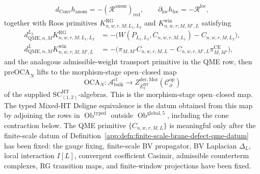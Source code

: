 \documentclass[11pt]{memoir}
\begin{document}
\begin{thm}
\[\begin{gathered}
	    d_{\mathrm{Conv}}h_{\mathrm{anom}}
	    =-(\mathcal R^{\mathrm{anom}})_{\mathrm{red}},\qquad
	    \partial_{\mathrm{loc}}h_{\mathrm{loc}}
	    =-\mathcal R^{\mathrm{loc}},
	  \end{gathered}
	  \]
		  together with Roos primitives
			  \(K^{\mathrm{RG}}_{n,w,r,M;L_1,L_2}\) and
			  \(K^{\mathrm{win}}_{n,w,r;M,M',L}\) satisfying
		  \[
		    \begin{aligned}
				    d^{L_2}_{\mathrm{QME},n,M}K^{\mathrm{RG}}_{n,w,r,M;L_1,L_2}
		    &=
			    -\bigl(W(P_{L_1,L_2},C_{n,w,r,M,L_1})
			      -C_{n,w,r,M,L_2}\bigr),\\
				    d^{L}_{\mathrm{QME},n,M}K^{\mathrm{win}}_{n,w,r;M,M',L}
		    &=
			    -\bigl(\pi_{M,M'}C_{n,w,r,M,L}
			      -C_{n,w,r,M',L}\pi^{\mathrm{CE}}_{M,M'}\bigr),
		    \end{aligned}
		  \]
		  and the analogous admissible-weight transport primitive in the QME
		  row, then \(\mathrm{preOCA}_N\) lifts to the
	  morphism-stage open--closed map
  \[
    \mathrm{OCA}_N\colon
    \mathcal A^{\mathrm{cl}}_{\mathrm{bulk}}
    \longrightarrow
    Z^{\mathrm{der},\mathrm{Mor}}_{E_2^{\mathrm{HT}}}
    (\mathcal C^{\mathrm{op}}_\partial)
  \]
  of the supplied \(\mathrm{SC}^{\mathrm{HT}}_{(1,2)}\)-algebras.  This
  is the morphism-stage open--closed map.  The typed Mixed-HT Deligne
  equivalence is the datum obtained from this map by adjoining the rows
  in \(\operatorname{Ob}^{\mathrm{typed}}\) outside
  \(\operatorname{Ob}^{\mathrm{global},5}\), including the cone
  contraction below.  The QME primitive
	  \(\{C_{n,w,r,M,L}\}\) is meaningful only after the finite-scale
  datum of Definition~\ref{app:defn:finite-scale-brane-defect-qme-datum}
  has been fixed: the gauge fixing,
  finite-scale BV propagator, BV Laplacian \(\Delta_L\), local
  interaction \(I[L]\), convergent coefficient Casimir, admissible
  counterterm complexes, RG transition maps, and finite-window
  projections have been fixed.


\end{thm}
\end{document}
